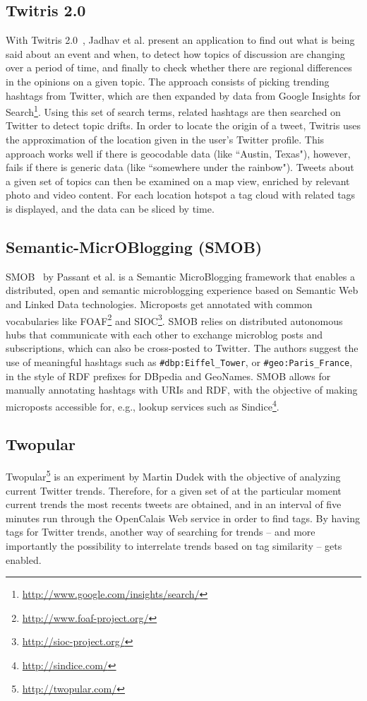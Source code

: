 \documentclass[runningheads,a4paper]{llncs}
\begin{document}
\subsection{Twitris 2.0}
With Twitris 2.0~\cite{Jadhav:Twitris}, Jadhav et al. present an application to find out what is being said about an event and when, to detect how topics of discussion are changing over a period of time, and finally to check whether there are regional differences in the opinions on a given topic. The approach consists of picking trending hashtags from Twitter, which are then expanded by data from Google Insights for Search\footnote{\url{http://www.google.com/insights/search/}}. Using this set of search terms, related hashtags are then searched on Twitter to detect topic drifts. In order to locate the origin of a tweet, Twitris uses the approximation of the location given in the user's Twitter profile. This approach works well if there is geocodable data (like ``Austin, Texas"), however, fails if there is generic data (like ``somewhere under the rainbow"). Tweets about a given set of topics can then be examined on a map view, enriched by relevant photo and video content. For each location hotspot a tag cloud with related tags is displayed, and the data can be sliced by time.

\subsection{Semantic-MicrOBlogging (SMOB)}
SMOB~\cite{Passant2008} by Passant et al. is a Semantic MicroBlogging framework that enables a distributed, open and semantic microblogging experience based on Semantic Web and Linked Data technologies. Microposts get annotated with common vocabularies like FOAF\footnote{\url{http://www.foaf-project.org/}} and SIOC\footnote{\url{http://sioc-project.org/}}. SMOB relies on distributed autonomous hubs that communicate with each other to exchange microblog posts and subscriptions, which can also be cross-posted to Twitter. The authors suggest the use of meaningful hashtags such as \texttt{\#dbp:Eiffel\_Tower}, or \texttt{\#geo:Paris\_France}, in the style of RDF prefixes for DBpedia and GeoNames. SMOB allows for manually annotating hashtags with URIs and RDF, with the objective of making microposts accessible for, e.g., lookup services such as Sindice\footnote{\url{http://sindice.com/}}.

\subsection{Twopular}\label{sec:twopular}
Twopular\footnote{\url{http://twopular.com/}} is an experiment by Martin Dudek with the objective of analyzing current Twitter trends. Therefore, for a given set of at the particular moment current trends the most recents tweets are obtained, and in an interval of five minutes run through the OpenCalais Web service in order to find tags. By having tags for Twitter trends, another way of searching for trends -- and more importantly the possibility to interrelate trends based on tag similarity -- gets enabled.
\end{document}
